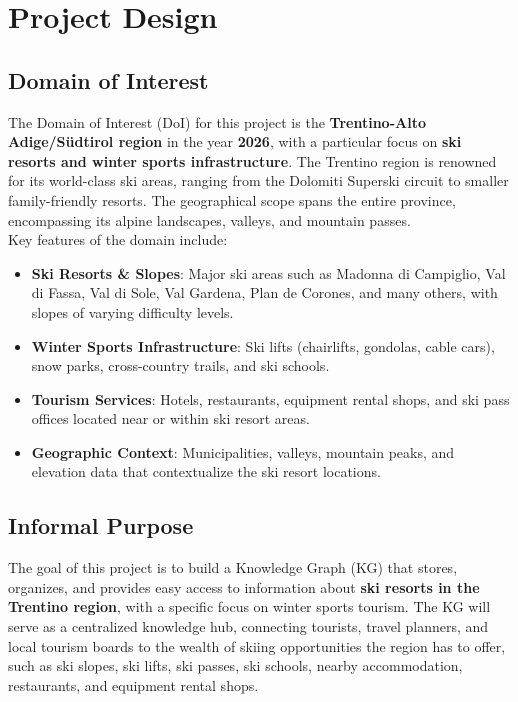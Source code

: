 \section{Project Design}

\subsection{Domain of Interest}

The Domain of Interest (DoI) for this project is the \textbf{Trentino-Alto Adige/S\"{u}dtirol region} in the year \textbf{2026}, with a particular focus on \textbf{ski resorts and winter sports infrastructure}. The Trentino region is renowned for its world-class ski areas, ranging from the Dolomiti Superski circuit to smaller family-friendly resorts. The geographical scope spans the entire province, encompassing its alpine landscapes, valleys, and mountain passes.\\

\noindent Key features of the domain include:
\begin{itemize}
    \item \textbf{Ski Resorts \& Slopes}: Major ski areas such as Madonna di Campiglio, Val di Fassa, Val di Sole, Val Gardena, Plan de Corones, and many others, with slopes of varying difficulty levels.
    \item \textbf{Winter Sports Infrastructure}: Ski lifts (chairlifts, gondolas, cable cars), snow parks, cross-country trails, and ski schools.
    \item \textbf{Tourism Services}: Hotels, restaurants, equipment rental shops, and ski pass offices located near or within ski resort areas.
    \item \textbf{Geographic Context}: Municipalities, valleys, mountain peaks, and elevation data that contextualize the ski resort locations.
\end{itemize}

\subsection{Informal Purpose}

The goal of this project is to build a Knowledge Graph (KG) that stores, organizes, and provides easy access to information about \textbf{ski resorts in the Trentino region}, with a specific focus on winter sports tourism. The KG will serve as a centralized knowledge hub, connecting tourists, travel planners, and local tourism boards to the wealth of skiing opportunities the region has to offer, such as ski slopes, ski lifts, ski passes, ski schools, nearby accommodation, restaurants, and equipment rental shops.
